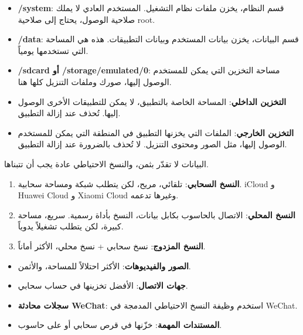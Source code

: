 
\begin{itemize}
  \item \textbf{/system}: قسم النظام، يخزن ملفات نظام التشغيل. المستخدم العادي لا يملك صلاحية الوصول، يحتاج إلى صلاحية root.
  \item \textbf{/data}: قسم البيانات، يخزن بيانات المستخدم وبيانات التطبيقات. هذه هي المساحة التي تستخدمها يومياً.
  \item \textbf{/sdcard أو /storage/emulated/0}: مساحة التخزين التي يمكن للمستخدم الوصول إليها، صورك وملفات التنزيل كلها هنا.
\end{itemize}


\begin{itemize}
  \item \textbf{التخزين الداخلي}: المساحة الخاصة بالتطبيق، لا يمكن للتطبيقات الأخرى الوصول إليها. تُحذف عند إزالة التطبيق.
  \item \textbf{التخزين الخارجي}: الملفات التي يخزنها التطبيق في المنطقة التي يمكن للمستخدم الوصول إليها، مثل الصور ومحتوى التنزيل. لا تُحذف بالضرورة عند إزالة التطبيق.
\end{itemize}


البيانات لا تقدّر بثمن، والنسخ الاحتياطي عادة يجب أن تتبناها.


\begin{enumerate}
  \item \textbf{النسخ السحابي}: تلقائي، مريح، لكن يتطلب شبكة ومساحة سحابية. iCloud و Huawei Cloud و Xiaomi Cloud وغيرها تدعمه.
  \item \textbf{النسخ المحلي}: الاتصال بالحاسوب بكابل بيانات، النسخ بأداة رسمية. سريع، مساحة كبيرة، لكن يتطلب تشغيلاً يدوياً.
  \item \textbf{النسخ المزدوج}: نسخ سحابي + نسخ محلي، الأكثر أماناً.
\end{enumerate}


\begin{itemize}
  \item \textbf{الصور والفيديوهات}: الأكثر احتلالاً للمساحة، والأثمن.
  \item \textbf{جهات الاتصال}: الأفضل تخزينها في حساب سحابي.
  \item \textbf{سجلات محادثة WeChat}: استخدم وظيفة النسخ الاحتياطي المدمجة في WeChat.
  \item \textbf{المستندات المهمة}: خزّنها في قرص سحابي أو على حاسوب.
\end{itemize}


